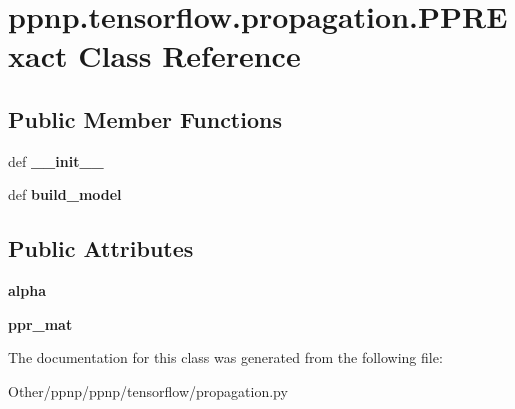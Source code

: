 \hypertarget{classppnp_1_1tensorflow_1_1propagation_1_1PPRExact}{}\section{ppnp.\+tensorflow.\+propagation.\+P\+P\+R\+Exact Class Reference}
\label{classppnp_1_1tensorflow_1_1propagation_1_1PPRExact}
\subsection*{Public Member Functions}
\begin{DoxyCompactItemize}
\item 
\mbox{\label{classppnp_1_1tensorflow_1_1propagation_1_1PPRExact_a626ac7cd0178cb098330428819ef5d60}} 
def {\bfseries \+\_\+\+\_\+init\+\_\+\+\_\+}
\item 
\mbox{\label{classppnp_1_1tensorflow_1_1propagation_1_1PPRExact_aaf441c929543fa652ea7c37d8461a851}} 
def {\bfseries build\+\_\+model}
\end{DoxyCompactItemize}
\subsection*{Public Attributes}
\begin{DoxyCompactItemize}
\item 
\mbox{\label{classppnp_1_1tensorflow_1_1propagation_1_1PPRExact_a8da2eb24c14354dd2cea3b5eec5064cd}} 
{\bfseries alpha}
\item 
\mbox{\label{classppnp_1_1tensorflow_1_1propagation_1_1PPRExact_a9b8d0c2897b79baa22b89485fcf9c358}} 
{\bfseries ppr\+\_\+mat}
\end{DoxyCompactItemize}


The documentation for this class was generated from the following file\+:\begin{DoxyCompactItemize}
\item 
Other/ppnp/ppnp/tensorflow/propagation.\+py\end{DoxyCompactItemize}
